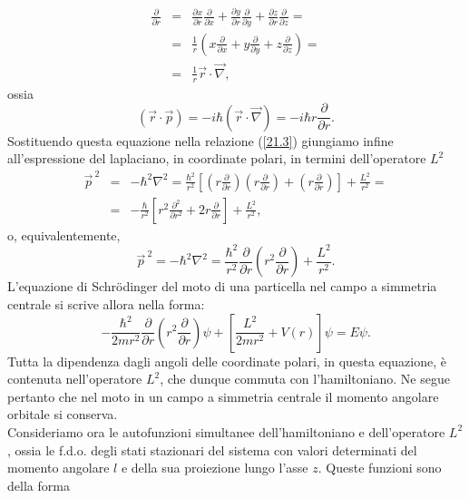 \documentclass[a4paper,12pt,oneside]{book}
\begin{document}
\begin{eqnarray} 
\frac{\partial}{\partial r}&=&\frac{\partial x}{\partial r} \frac{\partial}{\partial x}+\frac{\partial y}{\partial r} \frac{\partial}{\partial y}+\frac{\partial z}{\partial r} \frac{\partial}{\partial z}= \nonumber \\
&=& \frac{1}{r}\left(x\frac{\partial}{\partial x}+y\frac{\partial}{\partial y}+z\frac{\partial}{\partial z}\right)= \nonumber \\
&=&\frac{1}{r}\vec{r}\cdot\vec{\nabla} ,
\end{eqnarray}
ossia
\begin{equation}
\left(\vec{r}\cdot\vec{p}\right)=-i\hbar\left(\vec{r}\cdot\vec{\nabla}\right)=-i\hbar r \frac{\partial}{\partial r} .
\end{equation}
Sostituendo questa equazione nella relazione (\ref{21.3}) giungiamo infine all'espressione del laplaciano, in coordinate polari, in termini dell'operatore $L^2$
\begin{eqnarray}
\vec{p}^{\ 2}&=&-\hbar^2\nabla^2=\frac{\hbar^2}{r^2}\left[\left(r\frac{\partial}{\partial r}\right)\left(r\frac{\partial}{\partial r}\right)+\left(r\frac{\partial}{\partial r}\right)\right]+\frac{L^2}{r^2}= \nonumber \\
&=& -\frac{\hbar}{r^2}\left[r^2\frac{\partial^2}{\partial r^2}+2r\frac{\partial}{\partial r}\right]+\frac{L^2}{r^2} ,
\end{eqnarray}
o, equivalentemente,
\begin{equation}
\vec{p}^{\ 2}=-\hbar^2\nabla^2=\frac{\hbar^2}{r^2}\frac{\partial}{\partial r}\left(r^2 \frac{\partial}{\partial r}\right)+\frac{L^2}{r^2} .
\end{equation}
L'equazione di Schr\"{o}dinger del moto di una particella nel campo a simmetria centrale si scrive allora nella forma:
\begin{equation}
-\frac{\hbar^2}{2mr^2}\frac{\partial}{\partial r}\left(r^2\frac{\partial}{\partial r}\right)\psi+\left[\frac{L^2}{2mr^2}+V\left(r\right)\right]\psi=E\psi .
\end{equation}
Tutta la dipendenza dagli angoli delle coordinate polari, in questa equazione, è contenuta nell'operatore $L^2$, che dunque commuta con l'hamiltoniano. Ne segue pertanto che nel moto in un campo a simmetria centrale il momento angolare orbitale si conserva.\\
Consideriamo ora le autofunzioni simultanee dell'hamiltoniano e dell'operatore $L^2$, ossia le f.d.o. degli stati stazionari del sistema con valori determinati del momento angolare $l$ e della sua proiezione lungo l'asse $z$. Queste funzioni sono della forma
\end{document}
